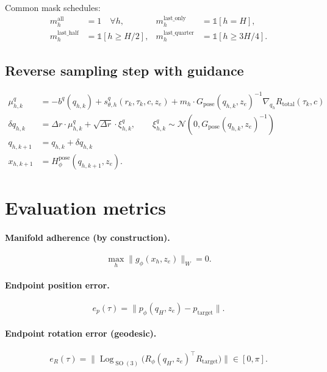 \documentclass[11pt,a4paper]{article}
\DeclareMathOperator{\Log}{Log}
\DeclareMathOperator{\SO}{SO}
\newcommand{\N}{\mathcal{N}}
\newcommand{\Hpose}{H_\phi^{\text{pose}}}
\begin{document}
Common mask schedules:
\begin{align}
m_h^{\text{all}} &= 1 \quad \forall h, &
m_h^{\text{last\_only}} &= \mathbb{1}[h = H], \\
m_h^{\text{last\_half}} &= \mathbb{1}[h \geq H/2], &
m_h^{\text{last\_quarter}} &= \mathbb{1}[h \geq 3H/4].
\end{align}

\subsection{Reverse sampling step with guidance}

\begin{align}
\mu_{h, k}^q &= -b^q(q_{h, k}) + s_{\theta, h}^q(r_k, \tau_k, c, z_e) + m_h \cdot G_{\text{pose}}(q_{h, k}, z_e)^{-1} \nabla_{q_h} R_{\text{total}}(\tau_k, c) \\
\delta q_{h, k} &= \Delta r \cdot \mu_{h, k}^q + \sqrt{\Delta r} \cdot \xi_{h, k}^q, \qquad \xi_{h, k}^q \sim \N(0, G_{\text{pose}}(q_{h, k}, z_e)^{-1}) \\
q_{h, k+1} &= q_{h, k} + \delta q_{h, k} \\
x_{h, k+1} &= \Hpose(q_{h, k+1}, z_e).
\end{align}

\section{Evaluation metrics}

\paragraph{Manifold adherence (by construction).}
\begin{equation}
\max_h \| g_\phi(x_h, z_e) \|_W = 0.
\end{equation}

\paragraph{Endpoint position error.}
\begin{equation}
e_p(\tau) = \| p_\phi(q_H, z_e) - p_{\text{target}} \|.
\end{equation}

\paragraph{Endpoint rotation error (geodesic).}
\begin{equation}
e_R(\tau) = \bigl\| \Log_{\SO(3)}\!\bigl( R_\phi(q_H, z_e)^\top R_{\text{target}} \bigr) \bigr\| \in [0, \pi].
\end{equation}
\end{document}
